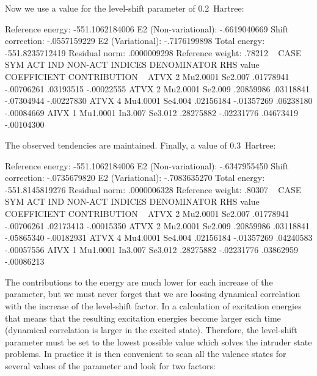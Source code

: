 Now we use a value for the level-shift parameter of 0.2~Hartree:

\begin{sourcelisting}
      Reference energy:        -551.1062184006
      E2 (Non-variational):       -.6619040669
      Shift correction:           -.0557159229
      E2 (Variational):           -.7176199898
      Total energy:            -551.8235712419
      Residual norm:               .0000009298
      Reference weight:            .78212
~
CASE  SYM   ACT IND   NON-ACT INDICES  DENOMINATOR  RHS value  COEFFICIENT CONTRIBUTION
~
ATVX   2   Mu2.0001   Se2.007           .01778941  -.00706261   .03193515  -.00022555
ATVX   2   Mu2.0001   Se2.009           .20859986   .03118841  -.07304944  -.00227830
ATVX   4   Mu4.0001   Se4.004           .02156184  -.01357269   .06238180  -.00084669
AIVX   1   Mu1.0001   In3.007 Se3.012   .28275882  -.02231776   .04673419  -.00104300
\end{sourcelisting}

The observed tendencies are maintained. Finally, a value of 0.3~Hartree:

\begin{sourcelisting}
      Reference energy:           -551.1062184006
      E2 (Non-variational):          -.6347955450
      Shift correction:              -.0735679820
      E2 (Variational):              -.7083635270
      Total energy:               -551.8145819276
      Residual norm:                  .0000006328
      Reference weight:               .80307
~
CASE  SYM   ACT IND   NON-ACT INDICES  DENOMINATOR  RHS value  COEFFICIENT CONTRIBUTION
~
ATVX   2   Mu2.0001   Se2.007           .01778941  -.00706261   .02173413  -.00015350
ATVX   2   Mu2.0001   Se2.009           .20859986   .03118841  -.05865340  -.00182931
ATVX   4   Mu4.0001   Se4.004           .02156184  -.01357269   .04240583  -.00057556
AIVX   1   Mu1.0001   In3.007 Se3.012   .28275882  -.02231776   .03862959  -.00086213
\end{sourcelisting}

The contributions to the energy are much lower for each increase of the
parameter, but we must never forget that we are loosing dynamical correlation
with the increase of the level-shift factor. In a calculation of excitation
energies that means that the resulting excitation energies become larger each time 
(dynamical correlation is larger in the excited state). 
Therefore, the level-shift parameter must be
set to the lowest possible value which solves the intruder state problems.
In practice it is then convenient to scan all the valence states for several
values of the parameter and look for two factors:

